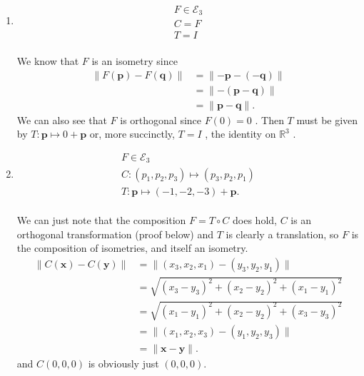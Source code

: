 \documentclass[12 pt, letterpaper]{hmcpset}
\begin{document}
\begin{solution}
	\begin{enumerate}
		\item 
			\[
				\boxed{
					\begin{gathered}
						F \in \mathcal{E}_{3} \\
						C = F \\
						T = I
					\end{gathered}
				}
			\] \\
			We know that $F$  is an isometry since
			\[
				\begin{split}
					\lVert F(\mathbf{p}) - F(\mathbf{q}) \rVert & = \lVert -\mathbf{p} - (-\mathbf{q}) \rVert \\
										    & = \lVert -(\mathbf{p} - \mathbf{q}) \rVert \\
										    & = \lVert \mathbf{p} - \mathbf{q} \rVert.
				\end{split}
			\]
			We can also see that $F$  is orthogonal since $F(0) = 0$ . Then $T$  must be given by $T : \mathbf{p} \mapsto 0 + \mathbf{p}$ or, more succinctly, $T = I$ , the identity on $\mathbb{R}^{3}$ .
		\item
			\[
				\boxed{
					\begin{gathered}
						F \in \mathcal{E}_{3} \\
						C : (p_{1}, p_{2}, p_{3}) \mapsto (p_{3}, p_{2}, p_{1}) \\
						T : \mathbf{p} \mapsto (-1, -2, -3) + \mathbf{p}.
					\end{gathered}
				}
			\] \\
			We can just note that the composition $F = T \circ C$ does hold, $C$ is an orthogonal transformation (proof below) and $T$ is clearly a translation, so $F$ is the composition of isometries, and itself an isometry.
			\[
				\begin{split}
					\lVert C(\mathbf{x}) - C(\mathbf{y}) \rVert & = \lVert (x_{3}, x_{2}, x_{1}) - (y_{3}, y_{2}, y_{1}) \rVert \\
										    & = \sqrt{(x_{3} - y_{3})^{2} + (x_{2} - y_{2})^{2} + (x_{1} - y_{1})^{2}} \\
										    & = \sqrt{(x_{1} - y_{1})^{2} + (x_{2} - y_{2})^{2} + (x_{3} - y_{3})^{2}} \\
										    & = \lVert (x_{1}, x_{2}, x_{3}) - (y_{1}, y_{2}, y_{3}) \rVert \\
										    & = \lVert \mathbf{x} - \mathbf{y} \rVert.
				\end{split}
			\]
			and $C(0, 0, 0)$ is obviously just $(0, 0, 0)$.

\end{enumerate}
\end{solution}
\end{document}
